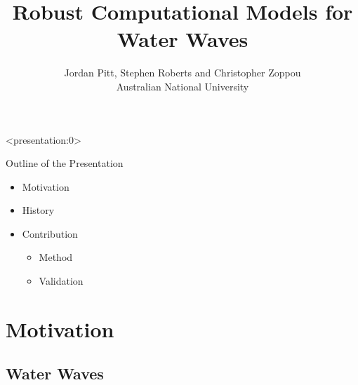 \documentclass[]{beamer}
\title{Robust Computational Models for Water Waves}
\author{Jordan Pitt, Stephen Roberts and Christopher Zoppou \\ Australian National University}
\begin{document}
	\begin{frame}<presentation:0>
		\cite{Zoppou-2014} \cite{Pitt-2018-61}
	\end{frame}
\begin{frame}
\titlepage
\end{frame}
\begin{frame}{Outline of the Presentation}
	
	\begin{itemize}
		\item Motivation
		\item History
		\item Contribution 
		\begin{itemize}
			\item Method
			\item Validation
		\end{itemize}
	\end{itemize}
	
\end{frame}

\section{Motivation}


\subsection{Water Waves}
\end{document}
